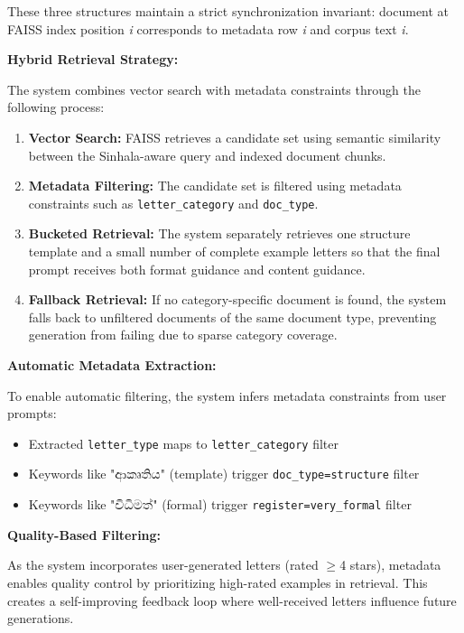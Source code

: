 \documentclass[12pt]{uomthesis}
\begin{document}
These three structures maintain a strict synchronization invariant: document at FAISS index position \textit{i} corresponds to metadata row \textit{i} and corpus text \textit{i}.

\textbf{Hybrid Retrieval Strategy:}

The system combines vector search with metadata constraints through the following process:

\begin{enumerate}
    \item \textbf{Vector Search:} FAISS retrieves a candidate set using semantic similarity between the Sinhala-aware query and indexed document chunks.
    \item \textbf{Metadata Filtering:} The candidate set is filtered using metadata constraints such as \texttt{letter\_category} and \texttt{doc\_type}.
    \item \textbf{Bucketed Retrieval:} The system separately retrieves one structure template and a small number of complete example letters so that the final prompt receives both format guidance and content guidance.
    \item \textbf{Fallback Retrieval:} If no category-specific document is found, the system falls back to unfiltered documents of the same document type, preventing generation from failing due to sparse category coverage.
\end{enumerate}

\textbf{Automatic Metadata Extraction:}

To enable automatic filtering, the system infers metadata constraints from user prompts:

\begin{itemize}
    \item Extracted \texttt{letter\_type} maps to \texttt{letter\_category} filter
    \item Keywords like "ආකෘතිය" (template) trigger \texttt{doc\_type=structure} filter
    \item Keywords like "විධිමත්" (formal) trigger \texttt{register=very\_formal} filter
\end{itemize}

\textbf{Quality-Based Filtering:}

As the system incorporates user-generated letters (rated $\geq$4 stars), metadata enables quality control by prioritizing high-rated examples in retrieval. This creates a self-improving feedback loop where well-received letters influence future generations.
\end{document}
